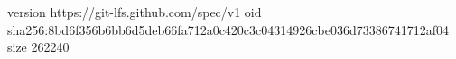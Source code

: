 version https://git-lfs.github.com/spec/v1
oid sha256:8bd6f356b6bb6d5deb66fa712a0c420c3c04314926cbe036d73386741712af04
size 262240
